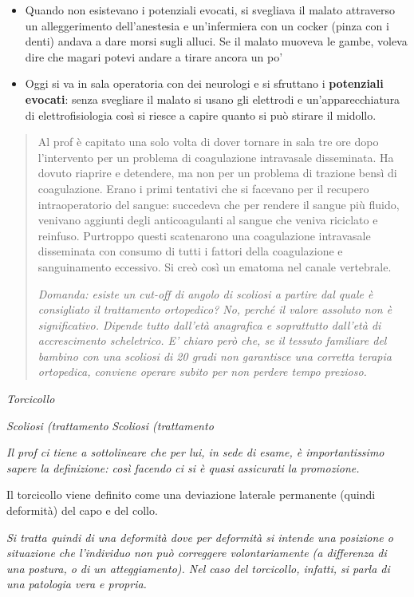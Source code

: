 \documentclass[]{article}
\begin{document}
\begin{itemize}
\item
  Quando non esistevano i potenziali evocati, si svegliava il malato
  attraverso un alleggerimento dell'anestesia e un'infermiera con un
  cocker (pinza con i denti) andava a dare morsi sugli alluci. Se il
  malato muoveva le gambe, voleva dire che magari potevi andare a tirare
  ancora un po'
\item
  Oggi si va in sala operatoria con dei neurologi e si sfruttano i
  \textbf{potenziali evocati}: senza svegliare il malato si usano gli
  elettrodi e un'apparecchiatura di elettrofisiologia così si riesce a
  capire quanto si può stirare il midollo.
\end{itemize}

\begin{quote}
Al prof è capitato una solo volta di dover tornare in sala tre ore dopo
l'intervento per un problema di coagulazione intravasale disseminata. Ha
dovuto riaprire e detendere, ma non per un problema di trazione bensì di
coagulazione. Erano i primi tentativi che si facevano per il recupero
intraoperatorio del sangue: succedeva che per rendere il sangue più
fluido, venivano aggiunti degli anticoagulanti al sangue che veniva
riciclato e reinfuso. Purtroppo questi scatenarono una coagulazione
intravasale disseminata con consumo di tutti i fattori della
coagulazione e sanguinamento eccessivo. Si creò così un ematoma nel
canale vertebrale.

\emph{Domanda: esiste un cut-off di angolo di scoliosi a partire dal
quale è consigliato il trattamento ortopedico? No, perché il valore
assoluto non è significativo. Dipende tutto dall'età anagrafica e
soprattutto dall'età di accrescimento scheletrico. E' chiaro però che,
se il tessuto familiare del bambino con una scoliosi di 20 gradi non
garantisce una corretta terapia ortopedica, conviene operare subito per
non perdere tempo prezioso.}
\end{quote}

\emph{Torcicollo}

\emph{Scoliosi (trattamento} \emph{Scoliosi (trattamento}

\emph{Il prof ci tiene a sottolineare che per lui, in sede di esame, è
importantissimo sapere la definizione: così facendo ci si è quasi
assicurati la promozione.}

Il torcicollo viene definito come una deviazione laterale permanente
(quindi deformità) del capo e del collo.

\emph{Si tratta quindi di una deformità dove per deformità si intende
una posizione o situazione che l'individuo non può correggere
volontariamente (a differenza di una postura, o di un atteggiamento).
Nel caso del torcicollo, infatti, si parla di una patologia vera e
propria.}
\end{document}
